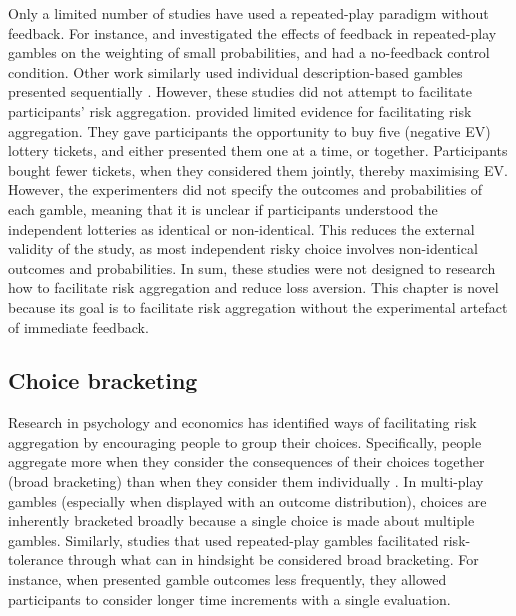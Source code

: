 \documentclass[a4paper, nobind, dvipsnames]{templates/ociamthesis}
\theoremstyle{definition}
\theoremstyle{definition}
\theoremstyle{definition}
\theoremstyle{definition}
\theoremstyle{remark}
\begin{document}
Only a limited number of studies have used a repeated-play paradigm without
feedback. For instance, \textcite{jessup2008} and \textcite{hertwig2004} investigated the effects of
feedback in repeated-play gambles on the weighting of small probabilities, and
had a no-feedback control condition. Other work similarly used individual
description-based gambles presented sequentially \autocites[e.g.,][]{ert2013,joag1990}.
However, these studies did not attempt to facilitate participants' risk
aggregation. \textcite{haisley2008} provided limited evidence for facilitating risk
aggregation. They gave participants the opportunity to buy five (negative EV)
lottery tickets, and either presented them one at a time, or together.
Participants bought fewer tickets, when they considered them jointly, thereby
maximising EV. However, the experimenters did not specify the outcomes and
probabilities of each gamble, meaning that it is unclear if participants
understood the independent lotteries as identical or non-identical. This reduces
the external validity of the study, as most independent risky choice involves
non-identical outcomes and probabilities. In sum, these studies were not
designed to research how to facilitate risk aggregation and reduce loss
aversion. This chapter is novel because its goal is to facilitate risk
aggregation without the experimental artefact of immediate feedback.

\subsection{Choice bracketing}

Research in psychology and economics has identified ways of facilitating risk
aggregation by encouraging people to group their choices. Specifically, people
aggregate more when they consider the consequences of their choices together
(broad bracketing) than when they consider them individually \autocite[narrow
bracketing;][]{read1999}. In multi-play gambles (especially when displayed with
an outcome distribution), choices are inherently bracketed broadly because a
single choice is made about multiple gambles. Similarly, studies that used
repeated-play gambles facilitated risk-tolerance through what can in hindsight
be considered broad bracketing. For instance, when \textcite{thaler1997} presented gamble
outcomes less frequently, they allowed participants to consider longer time
increments with a single evaluation.
\end{document}
